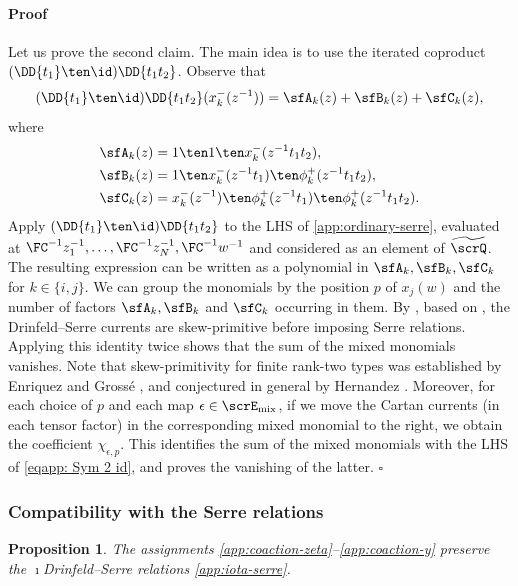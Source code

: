 \documentclass[reqno]{amsart}
\numberwithin{equation}{section}
\newtheorem*{proposition}{Proposition}
\newenvironment{pf}{\medskip\paragraph{{\sc Proof}}}{\hfill$\square$\par\medskip}
\begin{document}
\begin{pf}
Let us prove the second claim. The main idea is to use the iterated coproduct $(\DD{t_1}\ten\id)\DD{t_1t_2}$.
Observe that 
\[(\DD{t_1}\ten\id)\DD{t_1t_2}(x_k^-(z^{-1}))
=\sfA_k(z)+\sfB_k(z)+\sfC_k(z),\]
where
\[
\begin{gathered}
\begin{aligned}
\sfA_k(z)&=1\ten1\ten x_k^-(z^{-1}t_1t_2),\\
\sfB_k(z)&=1\ten x_k^-(z^{-1}t_1)\ten\phi_k^+(z^{-1}t_1t_2),\\
\sfC_k(z)&=x_k^-(z^{-1})\ten\phi_k^+(z^{-1}t_1)
                         \ten\phi_k^+(z^{-1}t_1t_2).
\end{aligned}
\end{gathered}
\]
Apply $(\DD{t_1}\ten\id)\DD{t_1t_2}$ to the LHS of \eqref{app:ordinary-serre}, evaluated at $\FC^{-1}z_1^{-1},\ldots,\FC^{-1}z_N^{-1},\FC^{-1}w^{-1}$ and
considered as an element of $\widetilde{\scrQ}$. The resulting expression can be 
written as a polynomial in $\sfA_k, \sfB_k, \sfC_k$ for $k \in \{i,j\}$. We can group the 
monomials by the position $p$ of $x_j(w)$ and the number of factors $\sfA_k, \sfB_k$ 
and $\sfC_k$ occurring in them. 
By
\cite[Lem.~4.4]{lu-pan-26}, based on
\cite[Thm.~6.16]{damiani-24}, the Drinfeld--Serre currents are
skew-primitive before imposing Serre relations. Applying this
identity twice shows that the sum of the mixed monomials
vanishes. Note that skew-primitivity for finite rank-two types was
established by Enriquez \cite[Cor.~4.1]{enriquez-00} and
Gross\'{e} \cite[Sec.~1.4]{grosse-07}, and conjectured in general
by Hernandez \cite[Sec.~6.3.1]{hernandez-07}.
Moreover, for each choice of $p$ and each map $\epsilon\in\scrE_{\rm mix}$, if we move the Cartan currents (in each tensor factor) in the corresponding mixed monomial to the right, we obtain the coefficient $\chi_{\epsilon,p}$. This identifies the sum of the mixed monomials with the LHS of \eqref{eqapp: Sym 2 id}, and proves the vanishing of the latter. 
\end{pf}

\subsubsection[Compatibility with the Serre relations]{Compatibility with the Serre relations}
\label{app:serre-prop}
\begin{proposition}
	The assignments \eqref{app:coaction-zeta}--\eqref{app:coaction-y} preserve the $\imath$Drinfeld--Serre relations \eqref{app:iota-serre}.
\end{proposition}
\end{document}
